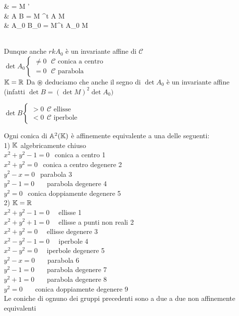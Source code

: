 \documentclass[12px]{article}
\begin{document}
	\begin{aligend}
		&  = \widetilde M \widetilde{\underline{X}}'\\
		& A \leftrightarrow B = \widetilde M ^t A \widetilde M\\
		& A_0 \leftrightarrow B_0 = M^t A_0 M \circledast
	\end{aligend}\\
	Dunque anche $rk A_0$ è un invariante affine di $\mathscr{C}$ \\
	$\det A_0 \begin{cases}
		\neq 0 \ \ \ \mathscr{C} \text{ conica a centro }\\
		=0 \ \ \ \mathscr{C} \text{ parabola}
	\end{cases}$\\
	$\mathbb{K} = \mathbb{R}$ Da  $\circledast$ deduciamo che anche il segno di $\det A_0$ è un invariante affine (infatti $\det B = (\det M)^2 \det A_0)$\\
	\begin{center}
	 $\det B  \begin{cases}
		 >0 \ \ \mathscr{C} \text{ ellisse}\\
		 < 0 \ \ \mathscr{C} \text{ iperbole}
	 \end{cases}$
	\end{center}
	\newpage
	\begin{teo}
		Ogni conica di $\mathbb{A}^2(\mathbb{K})$ è affinemente equivalente a una delle seguenti:\\
		1) $\mathbb{K}$ algebricamente chiuso \\
		$x^2 + y^2 - 1 = 0 \ \ $ conica a centro 1\\
		$x^2 + y^2 = 0 \ \ $ conica a centro degenere 2\\
		$y^2 -x = 0 \ \ $ parabola 3\\
		 $y^2-1=0$ \ \ \ parabola degenere 4\\
		 $y^2 = 0\ \ $ conica doppiamente degenere 5\\
		 2)  $\mathbb{K} = \mathbb{R}$\\
		  $x^2 + y^2 - 1 = 0$ \ \ ellisse 1\\
		  $x^2 + y^2 + 1 = 0$ \ \ ellisse a punti non reali 2\\
		  $x^2 + y^2 = 0$ \ \ ellisse degenere 3\\
		  $x^2 - y^2 -1 =0$ \ \ iperbole 4\\
		  $x^2 - y^2 = 0$ \ \ iperbole degenere 5\\
		  $y^2 - x =0 $ \ \ \ parabola 6\\
		  $y^2-1 = 0$ \ \ \ parabola degenere 7\\
		  $ y^2 + 1 = 0$ \ \ \ parabola degenere 8\\
		  $y^2 = 0$ \ \ \ conica doppiamente degenere 9 \\
 		  Le coniche di ognuno dei gruppi precedenti sono a due a due non affinemente equivalenti
	\end{teo}
\end{document}
